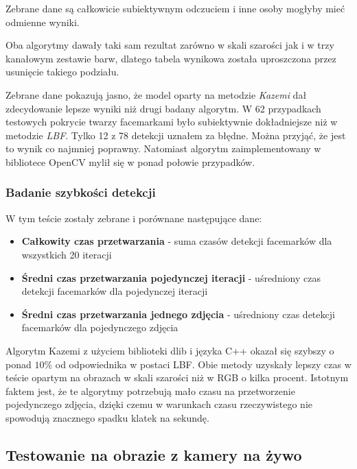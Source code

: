 Zebrane dane są całkowicie subiektywnym odczuciem i inne osoby mogłyby mieć odmienne wyniki.

\vspace{5mm}

Oba algorytmy dawały taki sam rezultat zarówno w skali szarości jak i w trzy kanałowym zestawie barw, dlatego tabela wynikowa została uproszczona przez usunięcie takiego podziału.



Zebrane dane pokazują jasno, że model oparty na metodzie \textit{Kazemi} dał zdecydowanie lepsze wyniki niż drugi badany algorytm. W 62 przypadkach testowych pokrycie twarzy facemarkami było subiektywnie dokładniejsze niż w metodzie \textit{LBF}. Tylko 12 z 78 detekcji uznałem za błędne. Można przyjąć, że jest to wynik co najmniej poprawny. Natomiast algorytm zaimplementowany w bibliotece OpenCV mylił się w ponad połowie przypadków.


\subsubsection{Badanie szybkości detekcji}

W tym teście zostały zebrane i porównane następujące dane:

\begin{itemize}
    \item \textbf{Całkowity czas przetwarzania} - suma czasów detekcji facemarków dla wszystkich 20 iteracji
    \item \textbf{Średni czas przetwarzania pojedynczej iteracji} - uśredniony czas detekcji facemarków dla pojedynczej iteracji
    \item \textbf{Średni czas przetwarzania jednego zdjęcia} - uśredniony czas detekcji facemarków dla pojedynczego zdjęcia
\end{itemize}



Algorytm Kazemi z użyciem biblioteki dlib i języka C++ okazał się szybszy o ponad $10\%$ od odpowiednika w postaci LBF. Obie metody uzyskały lepszy czas w teście opartym na obrazach w skali szarości niż w RGB o kilka procent. Istotnym faktem jest, że te algorytmy potrzebują mało czasu na przetworzenie pojedynczego zdjęcia, dzięki czemu w warunkach czasu rzeczywistego nie spowodują znacznego spadku klatek na sekundę. 

\subsection{Testowanie na obrazie z kamery na żywo}

